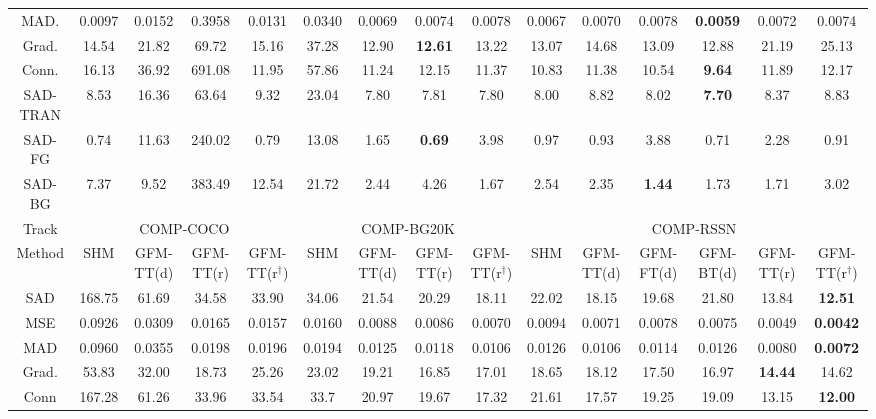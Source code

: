 \documentclass[twocolumn]{svjour3}
\begin{document}
\begin{table*}[htbp]
{\begin{tabular}{c|ccccc|ccc|ccc|ccc}
MAD. & 0.0097 & 0.0152 &0.3958 & 0.0131 &  0.0340&0.0069&0.0074 & 0.0078&0.0067&0.0070 &0.0078&\textbf{0.0059}&0.0072 & 0.0074\\
Grad. & 14.54 & 21.82 & 69.72 & 15.16 & 37.28&12.90&\textbf{12.61}&13.22 &13.07&14.68& 13.09&12.88&21.19 & 25.13\\
Conn. & 16.13 & 36.92 & 691.08 & 11.95 &  57.86&11.24&12.15&11.37 &10.83&11.38& 10.54&\textbf{9.64}&11.89 & 12.17\\
SAD-TRAN & 8.53 & 16.36 & 63.64 & 9.32 &23.04 &7.80&7.81&7.80 &8.00&8.82& 8.02&\textbf{7.70}&8.37 & 8.83\\
SAD-FG & 0.74 & 11.63  & 240.02 &0.79 & 13.08 &1.65&\textbf{0.69}&3.98&0.97&0.93& 3.88&0.71&2.28 & 0.91\\
SAD-BG & 7.37 & 9.52 & 383.49 &12.54 & 21.72 &2.44&4.26&1.67&2.54&2.35& \textbf{1.44}&1.73&1.71 & 3.02\\
\hline
Track & \multicolumn{4}{|c}{COMP-COCO} & \multicolumn{4}{|c}{COMP-BG20K} & \multicolumn{6}{|c}{COMP-RSSN}\\
\hline
Method & SHM & \multicolumn{1}{c}{GFM-TT(d)} & \multicolumn{1}{c}{GFM-TT(r)} & \multicolumn{1}{c|}{GFM-TT(r$^\dag$)} &\multicolumn{1}{c}{SHM} &\multicolumn{1}{c}{GFM-TT(d)} & GFM-TT(r)& \multicolumn{1}{c|}{GFM-TT(r$^\dag$)} &SHM & GFM-TT(d)&\multicolumn{1}{c}{GFM-FT(d)} & GFM-BT(d)& GFM-TT(r) & GFM-TT(r$^\dag$)\\
\hline
SAD & 168.75&61.69&34.58 & \multicolumn{1}{c|}{33.90}& \multicolumn{1}{c}{34.06}&\multicolumn{1}{c}{21.54}&20.29&\multicolumn{1}{c|}{18.11}&22.02&\multicolumn{1}{c}{18.15} &\multicolumn{1}{c}{19.68}&21.80 &13.84 & \textbf{12.51}\\
MSE &0.0926 &0.0309&0.0165 &\multicolumn{1}{c|}{0.0157}& \multicolumn{1}{c}{0.0160}&\multicolumn{1}{c}{0.0088}&0.0086&\multicolumn{1}{c|}{0.0070}&0.0094&\multicolumn{1}{c}{0.0071} &\multicolumn{1}{c}{0.0078}& 0.0075&0.0049 & \textbf{0.0042}\\
MAD & 0.0960&0.0355&0.0198&\multicolumn{1}{c|}{0.0196} &\multicolumn{1}{c}{0.0194} &\multicolumn{1}{c}{0.0125}&0.0118&\multicolumn{1}{c|}{0.0106}&0.0126&\multicolumn{1}{c}{0.0106} &\multicolumn{1}{c}{0.0114}&0.0126 &0.0080 & \textbf{0.0072}\\
Grad. & 53.83&32.00&18.73 &\multicolumn{1}{c|}{25.26}& \multicolumn{1}{c}{23.02}&\multicolumn{1}{c}{19.21}&16.85&\multicolumn{1}{c|}{17.01}&18.65&\multicolumn{1}{c}{18.12} &\multicolumn{1}{c}{17.50}&16.97 &\textbf{14.44} & 14.62\\
Conn & 167.28&61.26&33.96 &\multicolumn{1}{c|}{33.54}&\multicolumn{1}{c}{33.7} &\multicolumn{1}{c}{20.97}&19.67&\multicolumn{1}{c|}{17.32}&21.61&\multicolumn{1}{c}{17.57} &\multicolumn{1}{c}{19.25}&19.09 &13.15 & \textbf{12.00}\\

\end{tabular}}
\end{table*}
\end{document}
